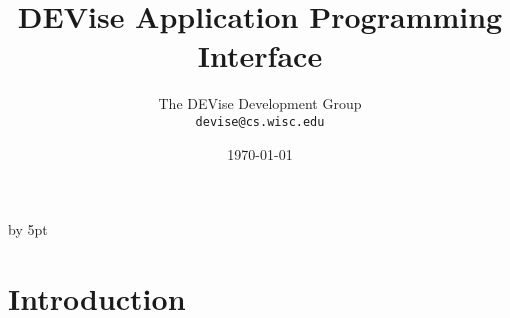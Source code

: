 %



%
%



\renewcommand{\topfraction}{1.0}
\renewcommand{\bottomfraction}{1.0}
\renewcommand{\textfraction}{0.0}
\advance\intextsep by 5pt

\def\filename#1{{\tt #1}}
\def\code#1{{\tt #1}}
\def\menu#1{{\tt #1}}
\def\term#1{#1}
\def\variable#1{{\tt #1}}

\def\scaleepspic[#1]#2#3{
\begin{figure}[htb]
\centering\leavevmode\epsfxsize=#1\epsfbox{#2}
\caption{#3}
\end{figure}
}

\def\fullepspic#1#2{
\begin{figure}[htb]
\centering\leavevmode\epsfxsize=\textwidth\epsfbox{#1}
\caption{#2}
\end{figure}
}


\title{DEVise Application Programming Interface}
\author{The DEVise Development Group \\
\code{devise@cs.wisc.edu}
}
\date{\today}

\maketitle

\section{Introduction}

